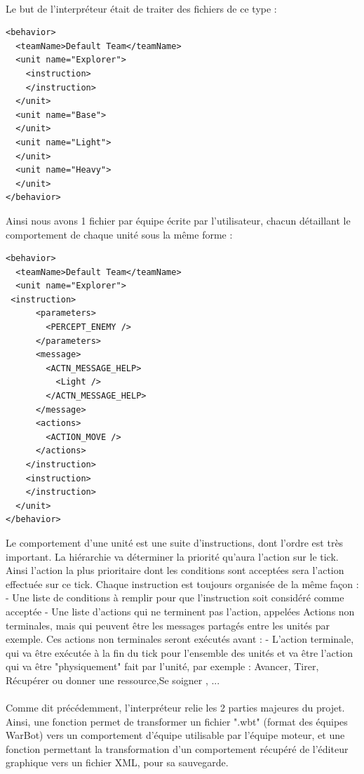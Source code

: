 \documentclass{report}
\begin{document}
\paragraph{}
Le but de l'interpréteur était de traiter des fichiers de ce type :
\begin{lstlisting}[frame=single]
<behavior>
  <teamName>Default Team</teamName>
  <unit name="Explorer">
    <instruction>
    </instruction>
  </unit>
  <unit name="Base">
  </unit>
  <unit name="Light">
  </unit>
  <unit name="Heavy">
  </unit>
</behavior>
\end{lstlisting}
Ainsi nous avons 1 fichier par équipe écrite par l'utilisateur, chacun détaillant le comportement de chaque unité sous la même forme :
\begin{lstlisting}[frame=single]
<behavior>
  <teamName>Default Team</teamName>
  <unit name="Explorer">
 <instruction>
      <parameters>
        <PERCEPT_ENEMY />
      </parameters>
      <message>
        <ACTN_MESSAGE_HELP>
          <Light />
        </ACTN_MESSAGE_HELP>
      </message>
      <actions>
        <ACTION_MOVE />
      </actions>
    </instruction>
    <instruction>
    </instruction>
  </unit>
</behavior>
\end{lstlisting}
Le comportement d'une unité est une suite d'instructions, dont l'ordre est très important. La hiérarchie va déterminer la priorité qu'aura l'action sur le tick. Ainsi l'action la plus prioritaire dont les conditions sont acceptées sera l'action effectuée sur ce tick.
Chaque instruction est toujours organisée de la même façon :
- Une liste de conditions à remplir pour que l'instruction soit considéré comme acceptée
- Une liste d'actions qui ne terminent pas l'action, appelées Actions non terminales, mais qui peuvent être les messages partagés entre les unités par exemple. Ces actions non terminales seront exécutés avant :
- L'action terminale, qui va être exécutée à la fin du tick pour l'ensemble des unités et va être l'action qui va être "physiquement" fait par l'unité, par exemple : Avancer, Tirer, Récupérer ou donner une ressource,Se soigner , ...
\paragraph{}
Comme dit précédemment, l'interpréteur relie les 2 parties majeures du projet.
Ainsi, une fonction permet de transformer un fichier ".wbt" (format des équipes WarBot) vers un comportement d'équipe utilisable par l'équipe moteur, et une fonction permettant la transformation d'un comportement récupéré de l'éditeur graphique vers un fichier XML, pour sa sauvegarde.
\newpage
\end{document}
